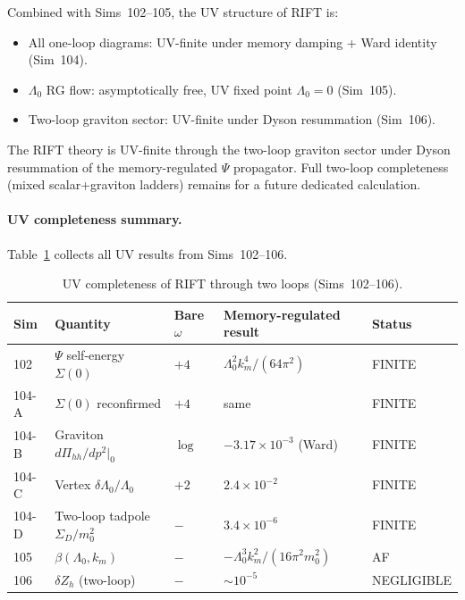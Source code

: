 \documentclass[12pt,a4paper]{article}
\begin{document}
Combined with Sims~102--105, the UV structure of RIFT is:
\begin{itemize}
\item All one-loop diagrams: UV-finite under memory damping + Ward identity (Sim~104).
\item $\Lambda_0$ RG flow: asymptotically free, UV fixed point $\Lambda_0=0$ (Sim~105).
\item Two-loop graviton sector: UV-finite under Dyson resummation (Sim~106).
\end{itemize}
The RIFT theory is UV-finite through the two-loop graviton sector under
Dyson resummation of the memory-regulated $\Psi$ propagator.
Full two-loop completeness (mixed scalar+graviton ladders) remains for
a future dedicated calculation.

\paragraph{UV completeness summary.}
Table~\ref{tab:uv_summary} collects all UV results from Sims~102--106.

\begin{table}[h]
\centering
\caption{UV completeness of RIFT through two loops (Sims~102--106).}
\label{tab:uv_summary}
\begin{tabular}{lllll}
\toprule
Sim & Quantity & Bare $\omega$ & Memory-regulated result & Status \\
\midrule
102       & $\Psi$ self-energy $\Sigma(0)$ & $+4$ & $\Lambda_0^2 k_m^4/(64\pi^2)$ & FINITE \\
104-A     & $\Sigma(0)$ reconfirmed        & $+4$ & same                          & FINITE \\
104-B     & Graviton $d\Pi_{hh}/dp^2|_0$  & $\log$ & $-3.17\times10^{-3}$ (Ward) & FINITE \\
104-C     & Vertex $\delta\Lambda_0/\Lambda_0$ & $+2$ & $2.4\times10^{-2}$      & FINITE \\
104-D     & Two-loop tadpole $\Sigma_D/m_0^2$ & $-$ & $3.4\times10^{-6}$        & FINITE \\
105       & $\beta(\Lambda_0,k_m)$         & $-$ & $-\Lambda_0^3 k_m^2/(16\pi^2 m_0^2)$ & AF \\
106       & $\delta Z_h$ (two-loop)        & $-$ & $\sim10^{-5}$               & NEGLIGIBLE \\
\bottomrule
\end{tabular}
\end{table}

\end{document}
